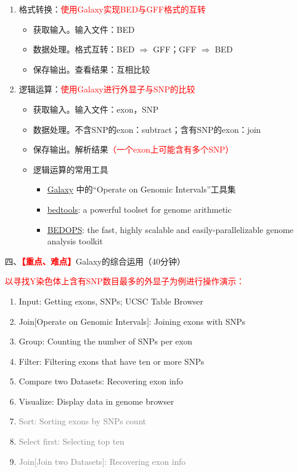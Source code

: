 \documentclass{TIJMUjiaoanLL}
\begin{document}
\begin{enumerate}
  \item 格式转换：\textcolor{red}{使用Galaxy实现BED与GFF格式的互转}
    \begin{itemize}
      \item 获取输入。输入文件：BED
      \item 数据处理。格式互转：BED $\Rightarrow$ GFF；GFF $\Rightarrow$ BED
      \item 保存输出。查看结果：互相比较
    \end{itemize}
  \item 逻辑运算：\textcolor{red}{使用Galaxy进行外显子与SNP的比较}
    \begin{itemize}
      \item 获取输入。输入文件：exon，SNP
      \item 数据处理。不含SNP的exon：subtract；含有SNP的exon：join
      \item 保存输出。解析结果\textcolor{red}{（一个exon上可能含有多个SNP）}
      \item 逻辑运算的常用工具
        \begin{itemize}
          \item \href{https://usegalaxy.org/}{Galaxy} 中的“Operate on Genomic Intervals”工具集
          \item \href{http://bedtools.readthedocs.org/en/latest/}{bedtools}: a powerful toolset for genome arithmetic
          \item \href{https://bedops.readthedocs.org/en/latest/}{BEDOPS}: the fast, highly scalable and easily-parallelizable genome analysis toolkit
        \end{itemize}
    \end{itemize}
\end{enumerate}

\vspace*{0.2cm}
\noindent
四、\textcolor{red}{\textbf{【重点、难点】}}Galaxy的综合运用（40分钟）

\textcolor{red}{以寻找Y染色体上含有SNP数目最多的外显子为例进行操作演示：}
\begin{enumerate}
  \item Input: Getting exons, SNPs; UCSC Table Browser
  \item Join[Operate on Genomic Intervals]: Joining exons with SNPs
  \item Group: Counting the number of SNPs per exon
  \item Filter: Filtering exons that have ten or more SNPs
  \item Compare two Datasets: Recovering exon info
  \item Visualize: Display data in genome browser
  \setcounter{enumi}{3}
\item \textcolor{gray}{Sort: Sorting exons by SNPs count}
  \setcounter{enumi}{3}
\item \textcolor{gray}{Select first: Selecting top ten}
  \setcounter{enumi}{4}
\item \textcolor{gray}{Join[Join two Datasets]: Recovering exon info}
\end{enumerate}
\end{document}
